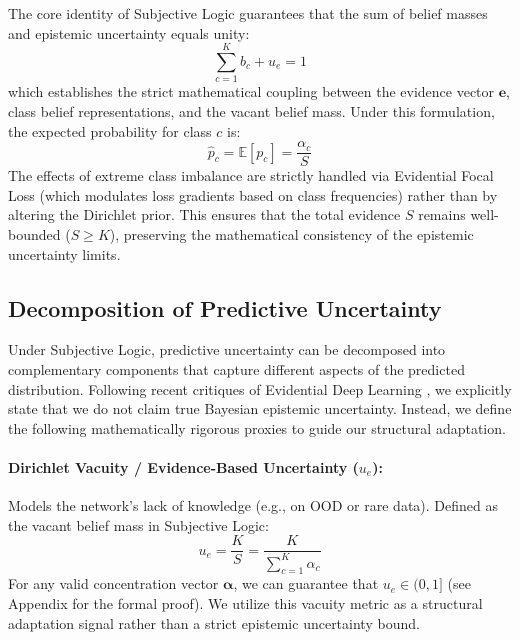 \documentclass[letterpaper]{article} %
\newcommand{\E}{\mathbb{E}}
\begin{document}
The core identity of Subjective Logic guarantees that the sum of belief masses and epistemic uncertainty equals unity:
\begin{equation}\label{eq:sl_identity}
    \sum_{c=1}^K b_c + u_e = 1
\end{equation}
which establishes the strict mathematical coupling between the evidence vector $\bm{e}$, class belief representations, and the vacant belief mass. Under this formulation, the expected probability for class $c$ is:
\begin{equation}\label{eq:p_hat}
    \hat{p}_c = \E[p_c] = \frac{\alpha_c}{S}
\end{equation}
The effects of extreme class imbalance are strictly handled via Evidential Focal Loss (which modulates loss gradients based on class frequencies) rather than by altering the Dirichlet prior. This ensures that the total evidence $S$ remains well-bounded ($S \ge K$), preserving the mathematical consistency of the epistemic uncertainty limits.

\subsection{Decomposition of Predictive Uncertainty}\label{subsec:uncertainties}
Under Subjective Logic, predictive uncertainty can be decomposed into complementary components that capture different aspects of the predicted distribution. Following recent critiques of Evidential Deep Learning \cite{shen2024mirage}, we explicitly state that we do not claim true Bayesian epistemic uncertainty. Instead, we define the following mathematically rigorous proxies to guide our structural adaptation.

\paragraph{Dirichlet Vacuity / Evidence-Based Uncertainty ($u_e$):} Models the network's lack of knowledge (e.g., on OOD or rare data). Defined as the vacant belief mass in Subjective Logic:
\begin{equation}\label{eq:u_e}
    u_e = \frac{K}{S} = \frac{K}{\sum_{c=1}^K \alpha_c}
\end{equation}
For any valid concentration vector $\bm{\alpha}$, we can guarantee that $u_e \in (0, 1]$ (see Appendix for the formal proof). We utilize this vacuity metric as a structural adaptation signal rather than a strict epistemic uncertainty bound.
\end{document}
